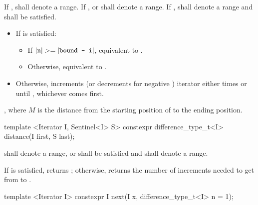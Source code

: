 \begin{itemdescr}
\pnum
\requires
If ,  shall denote a range. If
,  or  shall denote a range. If ,
 shall denote a range and 
shall be satisfied.

\pnum
\effects
\begin{itemize}
\item If  is satisfied:
      \begin{itemize}
      \item If \brk{}$|\texttt{n}| >= |\texttt{bound - i}|$, equivalent to .

      \item Otherwise, equivalent to .
      \end{itemize}

\item Otherwise, increments (or decrements for negative )
      iterator  either  times or until ,
      whichever comes first.
\end{itemize}

\pnum
\returns
{}, where $M$ is the distance from the starting position of
 to the ending position.
\end{itemdescr}

%
\begin{itemdecl}
template <Iterator I, Sentinel<I> S>
  constexpr difference_type_t<I> distance(I first, S last);
\end{itemdecl}

\begin{itemdescr}
\pnum
\requires
{} shall denote a range, or  shall be
satisfied and  shall denote a range.

\pnum
\effects
If  is satisfied, returns ; otherwise,
returns the number of increments needed to get from
to
.
\end{itemdescr}

%
\begin{itemdecl}
template <Iterator I>
  constexpr I next(I x, difference_type_t<I> n = 1);
\end{itemdecl}


